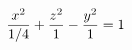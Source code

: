 \documentclass[preview]{standalone}
\begin{document}
\begin{align*}
\special{dvisvgm:raw <g id='unique000'>}\dfrac{x^2}{1/4}+\dfrac{z^2}{1}-\dfrac{y^2}{1}=1\special{dvisvgm:raw </g>}
\end{align*}
\end{document}
